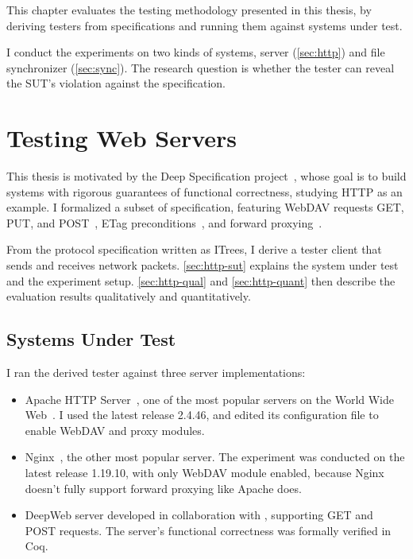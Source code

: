 This chapter evaluates the testing methodology presented in this thesis, by
deriving testers from specifications and running them against systems under
test.  

I conduct the experiments on two kinds of systems, \http server
(\autoref{sec:http}) and file synchronizer (\autoref{sec:sync}).  The research
question is whether the tester can reveal the SUT's violation against the
specification.

\section{Testing Web Servers}
\label{sec:http}

This thesis is motivated by the Deep Specification project~\cite{deepspec},
whose goal is to build systems with rigorous guarantees of functional
correctness, studying HTTP as an example.  I formalized a subset of \http
specification, featuring WebDAV requests GET, PUT, and POST~\cite{rfc4918}, ETag
preconditions~\cite{rfc7232}, and forward proxying~\cite{rfc7231}.

From the protocol specification written as ITrees, I derive a tester client
that sends and receives network packets.  \autoref{sec:http-sut} explains the
system under test and the experiment setup.  \autoref{sec:http-qual} and
\autoref{sec:http-quant} then describe the evaluation results qualitatively and
quantitatively.

\subsection{Systems Under Test}
\label{sec:http-sut}
I ran the derived tester against three server implementations:

\begin{itemize}
\item Apache HTTP Server~\cite{Apache}, one of the most popular servers
  on the World Wide Web~\cite{http-netcraft,http-stats}.  I used the latest
  release 2.4.46, and edited its configuration file to enable WebDAV and proxy
  modules.
\item Nginx~\cite{nginx}, the other most popular server.  The experiment was
  conducted on the latest release 1.19.10, with only WebDAV module enabled,
  because Nginx doesn't fully support forward proxying like Apache does.
\item DeepWeb server developed in collaboration with \citet{itp21}, supporting
  GET and POST requests.  The server's functional correctness was formally
  verified in Coq.
\end{itemize}


